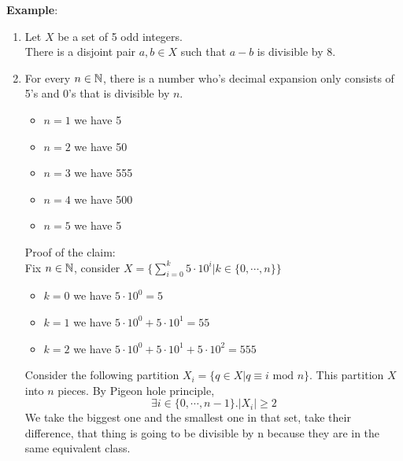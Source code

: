 \noindent \textbf{Example}:
\begin{enumerate}
    \item Let $X$ be a set of 5 odd integers.\\
    There is a disjoint pair $a,b \in X$ such that $a-b$ is divisible by 8.
    \item For every $n \in \mathbb{N}$, there is a number who's decimal expansion only consists of 5's and 0's that is divisible by $n$.
    \begin{itemize}
        \item $n=1$ we have 5
        \item $n=2$ we have 50
        \item $n=3$ we have 555
        \item $n=4$ we have 500
        \item $n=5$ we have 5
    \end{itemize}
    Proof of the claim:\\
    Fix $n \in \mathbb{N}$, consider $X=\{\sum_{i=0}^k5 \cdot 10^i | k \in \{0, \cdots,n\}\}$
    \begin{itemize}
        \item $k=0$ we have $5 \cdot 10^0=5$
        \item $k=1$ we have $5 \cdot 10^0 + 5 \cdot 10^1=55$
        \item $k=2$ we have $5 \cdot 10^0 + 5 \cdot 10^1 + 5 \cdot 10^2=555$
    \end{itemize}
    Consider the following partition $X_i=\{q \in X | q \equiv i \text{ mod } n\}$. 
    This partition $X$ into $n$ pieces. 
    By Pigeon hole principle, $$\exists i \in \{0,\cdots,n-1\}. |X_i| \geq 2$$
    We take the biggest one and the smallest one in that set, take their difference, 
    that thing is going to be divisible by n because they are in the same equivalent class.
\end{enumerate}